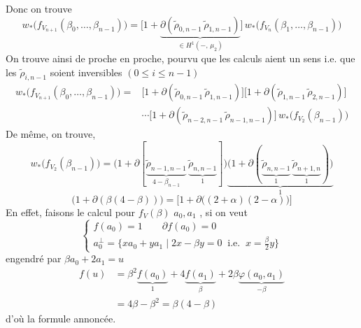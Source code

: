 \documentclass[11pt,a4paper]{article}
\begin{document}
Donc on trouve
\[
w_*\bigl(f_{V_{n+1}}(\beta_0, \dots, \beta_{n-1})\bigr) = \bigl[1 + \underbrace{\partial(\tilde\rho_{0,n-1}\, \tilde\rho_{1,n-1})}_{\in H^1(-,\, \mu_2)}\bigr]\, w_*\bigl(f_{V_n}(\beta_1, \dots, \beta_{n-1})\bigr)
\]
On trouve ainsi de proche en proche, pourvu que les calculs aient un sens i.e. que  les $\tilde\rho_{i,n-1}$ soient inversibles $(0 \leq i \leq n-1)$
\[
\begin{aligned}
w_*\bigl(f_{V_{n+1}}(\beta_0, \dots, \beta_{n-1})\bigr) = {}& \bigl[1 + \partial(\tilde\rho_{0,n-1}\, \tilde\rho_{1,n-1})\bigr] \bigl[1 + \partial(\tilde\rho_{1,n-1}\, \tilde\rho_{2,n-1})\bigr] \\
& \cdots \bigl[1 + \partial(\tilde\rho_{n-2,n-1}\, \tilde\rho_{n-1,n-1})\bigr]\, w_*\bigl(f_{V_2}(\beta_{n-1})\bigr)
\end{aligned}
\]
De même, on trouve,
\[
w_*\bigl(f_{V_2}(\beta_{n-1})\bigr) = \bigl(1 + \partial[\underbrace{\tilde\rho_{n-1,n-1}}_{4 - \beta_{n-1}}\, \underbrace{\tilde\rho_{n,n-1}}_{1}]\bigr) \underbrace{\bigl(1 + \partial(\underbrace{\tilde\rho_{n,n-1}}_{1}\, \underbrace{\tilde\rho_{n+1,n}}_{1})\bigr)}_{1}
\]
\[
\bigl(1 + \partial(\beta(4 - \beta))\bigr) = \bigl[1 + \partial\bigl((2 + \alpha)(2 - \alpha)\bigr)\bigr]
\]
 En effet, faisons le calcul pour $f_V(\beta)$ \ill{} $a_0, a_1$ \ill{} \ill{}, si on veut
\[
\begin{cases}
f(a_0) = 1 \qquad \partial f(a_0) = 0 \\
a_0^{\perp} = \lbrace x a_0 + y a_1 \mid 2x - \beta y = 0 \ \text{ i.e. } \ x = \frac{\beta}{2} y \rbrace
\end{cases}
\]
engendré par $\beta a_0 + 2 a_1 = u$
\[
\begin{aligned}
f(u) &= \beta^2 \underbrace{f(a_0)}_{1} + 4 \underbrace{f(a_1)}_{\beta} + 2\beta \underbrace{\varphi(a_0, a_1)}_{-\beta} \\
&= 4\beta - \beta^2 = \beta(4 - \beta)
\end{aligned}
\]
d'où  la formule annoncée.
\end{document}
